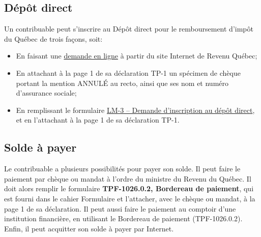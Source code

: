 \subsection{Dépôt direct}
Un contribuable peut s'inscrire au \og Dépôt direct \fg{} pour le remboursement d'impôt du Québec de trois façons, soit:
\begin{itemize}[label=]
	\item En faisant une \href{https://www.revenuquebec.ca/fr/citoyens/votre-situation/depot-direct/}{demande en ligne} à partir du site Internet de Revenu Québec;
	\item En attachant à la page 1 de sa déclaration TP-1 un spécimen de chèque portant la mention \og ANNULÉ \fg{} au recto, ainsi que ses nom et numéro d'assurance sociale;
	\item En remplissant le formulaire \href{https://www.revenuquebec.ca/fr/services-en-ligne/formulaires-et-publications/details-courant/lm-3/}{LM-3 -- Demande d'inscription au dépôt direct}, et en l'attachant à la page 1 de sa déclaration TP-1.
\end{itemize}

\subsection{Solde à payer}
Le contribuable a plusieurs possibilités pour payer son solde. Il peut faire le paiement par chèque ou mandat à l'ordre du ministre du Revenu du Québec. Il doit alors remplir le formulaire \textbf{TPF-1026.0.2, Bordereau de paiement}, qui est fourni dans le cahier \og Formulaire \fg{} et l'attacher, avec le chèque ou mandat, à la page 1 de sa déclaration. Il peut aussi faire le paiement au comptoir d'une institution financière, en utilisant le Bordereau de paiement (TPF-1026.0.2). Enfin, il peut acquitter son solde à payer par Internet.

